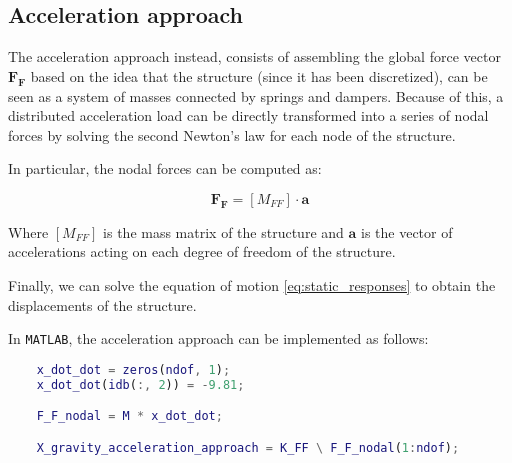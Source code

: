 \subsection{Acceleration approach}
\label{subsec:acceleration_approach}

The acceleration approach instead, consists of assembling the global force vector $\mathbf{F_F}$ based on the idea that the structure (since it has been discretized), can be seen as a system of masses connected by springs and dampers.
Because of this, a distributed acceleration load can be directly transformed into a series of nodal forces by solving the second Newton's law for each node of the structure.

In particular, the nodal forces can be computed as:

\begin{equation}
    \mathbf{F_F} = [M_{FF}] \cdot \mathbf{a}
\end{equation}

Where $[M_{FF}]$ is the mass matrix of the structure and $\mathbf{a}$ is the vector of accelerations acting on each degree of freedom of the structure.

Finally, we can solve the equation of motion \ref{eq:static_responses} to obtain the displacements of the structure.

In \texttt{MATLAB}, the acceleration approach can be implemented as follows:

\begin{lstlisting}[language=Matlab, caption={Acceleration approach to compute the static responses of the structure.}]
    % Acceleration approach.
    x_dot_dot = zeros(ndof, 1);
    x_dot_dot(idb(:, 2)) = -9.81;

    F_F_nodal = M * x_dot_dot;

    X_gravity_acceleration_approach = K_FF \ F_F_nodal(1:ndof);
\end{lstlisting}
